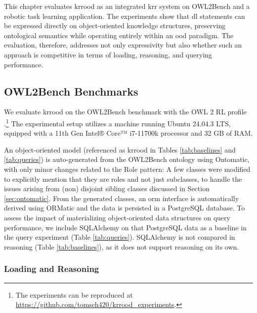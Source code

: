 \documentclass{article}
\begin{document}
This chapter evaluates \ac{krrood} as an integrated \ac{krr} system on OWL2Bench and a robotic task learning application. The experiments show that \ac{dl} statements can be expressed directly on object-oriented knowledge structures, preserving ontological semantics while operating entirely within an \ac{ood} paradigm. The evaluation, therefore, addresses not only expressivity but also whether such an approach is competitive in terms of loading, reasoning, and querying performance.
    
\subsection{OWL2Bench Benchmarks}

We evaluate \ac{krrood} on the OWL2Bench benchmark with the OWL 2 RL profile \cite{singh2020owl2bench}.\footnote{ The experiments can be reproduced at \url{https://github.com/tomsch420/krrood_experiments}.}
The experimental setup utilizes a machine running Ubuntu 24.04.3 LTS, equipped with a 11th Gen Intel® Core™ i7-11700k processor and 32 GB of RAM.

An object-oriented model (referenced as \ac{krrood} in Tables \ref{tab:baselines} and \ref{tab:queries}) is auto-generated from the OWL2Bench ontology using Ontomatic, with only minor changes related to the Role pattern: A few classes were modified to explicitly mention that they are roles and not just subclasses, to handle the issues arising from (non) disjoint sibling classes discussed in Section \ref{sec:ontomatic}. From the generated classes, an \ac{orm} interface is automatically derived using ORMatic and the data is persisted in a PostgreSQL database. To assess the impact of materializing object-oriented data structures on query performance, we include SQLAlchemy on that PostgreSQL data as a baseline in the query experiment (Table \ref{tab:queries}). SQLAlchemy is not compared in reasoning (Table \ref{tab:baselines}), as it does not support reasoning on its own. 

\subsubsection{Loading and Reasoning}
\end{document}
